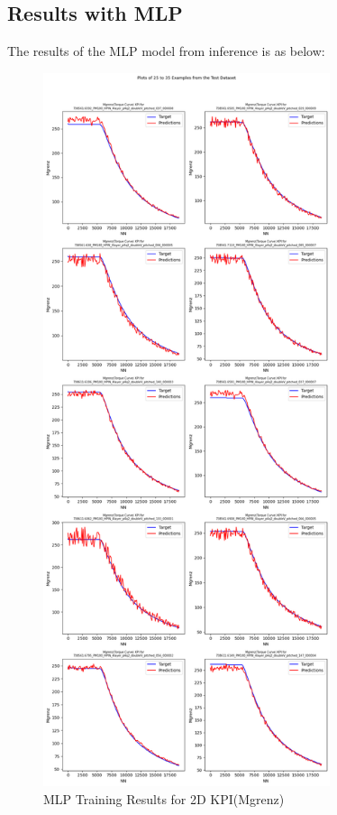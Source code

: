 \documentclass{report} %
\begin{document}
\subsection*{Results with \ac{MLP}}

The results of the \ac{MLP} model from inference is as below: \\

\begin{figure}[h]
    \centering
    \includegraphics[width=0.75\textwidth]{./ReportImages/KPI2D_predictions.png} 
    \caption{MLP Training Results for 2D KPI(Mgrenz)} 
    \label{fig:MLP Training Results for 2D KPI(Mgrenz)}
\end{figure}
\end{document}
